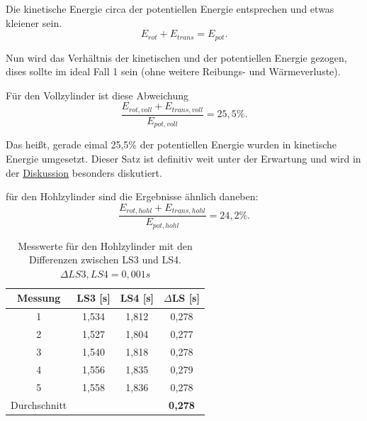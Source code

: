 Die kinetische Energie circa der potentiellen Energie entsprechen und etwas kleiener sein.
\begin{equation}
    E_{rot} + E_{trans} = E_{pot}.
\end{equation}

Nun wird das Verhältnis der kinetischen und der potentiellen Energie gezogen, dises sollte im ideal Fall 1 sein (ohne weitere Reibungs- und Wärmeverluste).

Für den Vollzylinder ist diese Abweichung
\begin{equation}
    \frac{E_{rot,voll} + E_{trans,voll} }{E_{pot,voll}} = 25,5\%.
\end{equation}

Das heißt, gerade eimal 25,5\% der potentiellen Energie wurden in kinetische Energie umgesetzt. Dieser Satz ist definitiv weit unter der Erwartung und wird in der \hyperref[ch:diskussion]{Diskussion} besonders diskutiert.

für den Hohlzylinder sind die Ergebnisse ähnlich daneben:
\begin{equation}
    \frac{E_{rot,hohl} + E_{trans,hohl} }{E_{pot,hohl}} = 24,2\%.
\end{equation}



\begin{table}[!ht]
    \centering
    \begin{tabular}{c | c | c | c}
    \toprule
    Messung & LS3 [s] & LS4 [s] & $\Delta$LS [s] \\
    \hline
    1 & 1,534 & 1,812 & 0,278 \\
    2 & 1,527 & 1,804 & 0,277 \\
    3 & 1,540 & 1,818 & 0,278 \\
    4 & 1,556 & 1,835 & 0,279 \\
    5 & 1,558 & 1,836 & 0,278 \\
    \hline
    Durchschnitt &     &     & \textbf{0,278} \\
    \bottomrule
    \end{tabular}
    \caption{Messwerte für den Hohlzylinder mit den Differenzen zwischen LS3 und LS4. $\Delta LS3,LS4 = 0,001s$}
    \label{tab:hohlzylinder_ls}
\end{table}
